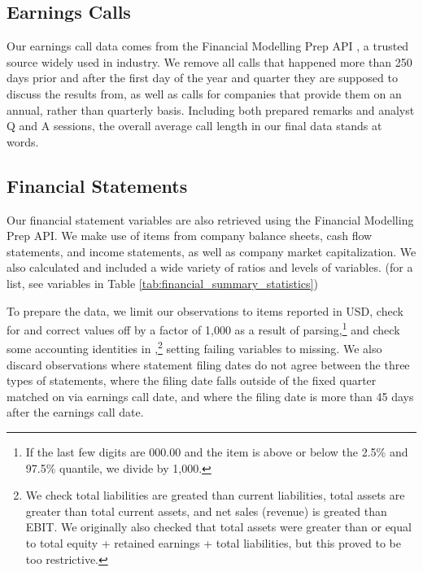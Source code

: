 \documentclass{article}[11pt]
\begin{document}
    \subsection*{Earnings Calls}

    Our earnings call data comes from the Financial Modelling Prep API \citep{financial_modeling_prep_financial_2024}, a trusted source widely used in industry. We remove all calls that happened more than 250 days prior and after the first day of the year and quarter they are supposed to discuss the results from, as well as calls for companies that provide them on an annual, rather than quarterly basis. Including both prepared remarks and analyst Q and A sessions, the overall average call length in our final data stands at \avgCallLength \space words.

    \subsection*{Financial Statements}

    Our financial statement variables are also retrieved using the Financial Modelling Prep API. We make use of items from company balance sheets, cash flow statements, and income statements, as well as company market capitalization. We also calculated and included a wide variety of ratios and levels of variables. (for a list, see variables in Table \ref{tab:financial_summary_statistics})
    
    To prepare the data, we limit our observations to items reported in USD, check for and correct values off by a factor of 1,000 as a result of parsing,\footnote{If the last few digits are 000.00 and the item is above or below the 2.5\% and 97.5\% quantile, we divide by 1,000.} and check some accounting identities in \cite{das_credit_2023},\footnote{We check total liabilities are greated than current liabilities, total assets are greater than total current assets, and net sales (revenue) is greated than EBIT. We originally also checked that total assets were greater than or equal to total equity + retained earnings + total liabilities, but this proved to be too restrictive.} setting failing variables to missing. We also discard observations where statement filing dates do not agree between the three types of statements, where the filing date falls outside of the fixed quarter matched on via earnings call date, and where the filing date is more than 45 days after the earnings call date.
\end{document}

